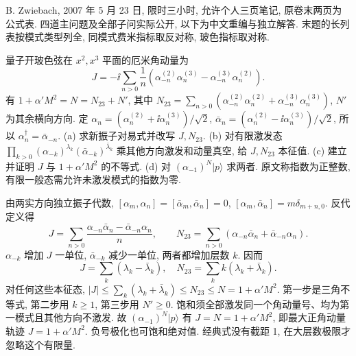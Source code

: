 B. Zwiebach, 2007 年 5 月 23 日, 限时三小时, 允许个人三页笔记, 原卷末两页为公式表. 四道主问题及全部子问实际公开, 以下为中文重编与独立解答. 末题的长列表按模式类型列全, 同模式费米指标取反对称, 玻色指标取对称.

\begin{exercise}
量子开玻色弦在 $x^2,x^3$ 平面的厄米角动量为
\[
 J=-\ii\sum_{n>0}\frac1n
 (\alpha_{-n}^{(2)}\alpha_n^{(3)}-\alpha_{-n}^{(3)}\alpha_n^{(2)}).
\]
有 $1+\alpha'M^2=N=N_{23}+N'$, 其中
$N_{23}=\sum_{n>0}(\alpha_{-n}^{(2)}\alpha_n^{(2)}+
\alpha_{-n}^{(3)}\alpha_n^{(3)})$, $N'$ 为其余横向方向.
定 $\alpha_n=(\alpha_n^{(2)}+\ii\alpha_n^{(3)})/\sqrt2$,
$\bar\alpha_n=(\alpha_n^{(2)}-\ii\alpha_n^{(3)})/\sqrt2$, 所以 $\alpha_n^\dagger=\bar\alpha_{-n}$.
(a) 求新振子对易式并改写 $J,N_{23}$.
(b) 对有限激发态
$\prod_{k>0}(\alpha_{-k})^{\lambda_k}(\bar\alpha_{-k})^{\bar\lambda_k}$ 乘其他方向激发和动量真空, 给 $J,N_{23}$ 本征值.
(c) 建立并证明 $J$ 与 $1+\alpha'M^2$ 的不等式.
(d) 对 $(\alpha_{-1})^N|p\rangle$ 求两者. 原文称指数为正整数, 有限一般态需允许未激发模式的指数为零.
\end{exercise}
\begin{solution}
由两实方向独立振子代数,
$[\alpha_m,\alpha_n]=[\bar\alpha_m,\bar\alpha_n]=0$,
$[\alpha_m,\bar\alpha_n]=m\delta_{m+n,0}$. 反代定义得
\[
 J=\sum_{n>0}\frac{\alpha_{-n}\bar\alpha_n-\bar\alpha_{-n}\alpha_n}{n},
 \qquad N_{23}=\sum_{n>0}(\alpha_{-n}\bar\alpha_n+\bar\alpha_{-n}\alpha_n).
\]
$\alpha_{-k}$ 增加 $J$ 一单位, $\bar\alpha_{-k}$ 减少一单位, 两者都增加层数 $k$. 因而
\[
 J=\sum_k(\lambda_k-\bar\lambda_k),\quad
 N_{23}=\sum_k k(\lambda_k+\bar\lambda_k).
\]
对任何这些本征态,
$|J|\leq\sum_k(\lambda_k+\bar\lambda_k)\leq N_{23}\leq N=1+\alpha'M^2$.
第一步是三角不等式, 第二步用 $k\geq1$, 第三步用 $N'\geq0$. 饱和须全部激发同一个角动量号、均为第一模式且其他方向不激发.
故 $(\alpha_{-1})^N|p\rangle$ 有 $J=N=1+\alpha'M^2$, 即最大正角动量轨迹 $J=1+\alpha'M^2$. 负号极化也可饱和绝对值. 经典式没有截距 1, 在大层数极限才忽略这个有限量.
\end{solution}


